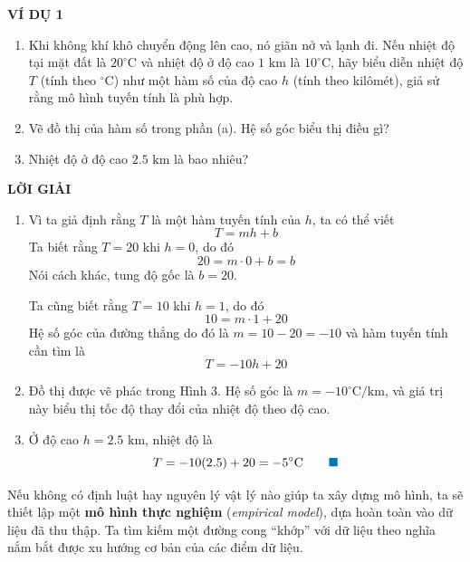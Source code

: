 \begin{minipage}[t]{0.708\textwidth}
    \fontsize{8.8pt}{11.5pt}\selectfont
    \noindent\textbf{\textsf{\color{stewartcyan}VÍ DỤ 1}}
    \begin{enumerate}[label=(\alph*), leftmargin=*, itemsep=2pt, topsep=2pt]
        \item Khi không khí khô chuyển động lên cao, nó giãn nở và lạnh đi. Nếu nhiệt độ tại mặt đất là $20^\circ\text{C}$ và nhiệt độ ở độ cao $1\text{ km}$ là $10^\circ\text{C}$, hãy biểu diễn nhiệt độ $T$ (tính theo $^\circ\text{C}$) như một hàm số của độ cao $h$ (tính theo kilômét), giả sử rằng mô hình tuyến tính là phù hợp.
        \item Vẽ đồ thị của hàm số trong phần (a). Hệ số góc biểu thị điều gì?
        \item Nhiệt độ ở độ cao $2.5\text{ km}$ là bao nhiêu?
    \end{enumerate}

    \vspace{3pt}
    \noindent\textbf{\textsf{\color{stewartcyan}LỜI GIẢI}}
    \begin{enumerate}[label=(\alph*), leftmargin=*, itemsep=3pt, topsep=2pt]
        \item Vì ta giả định rằng $T$ là một hàm tuyến tính của $h$, ta có thể viết
        \[
        T = mh + b
        \]
        Ta biết rằng $T = 20$ khi $h = 0$, do đó
        \[
        20 = m \cdot 0 + b = b
        \]
        Nói cách khác, tung độ gốc là $b = 20$.

        Ta cũng biết rằng $T = 10$ khi $h = 1$, do đó
        \[
        10 = m \cdot 1 + 20
        \]
        Hệ số góc của đường thẳng do đó là $m = 10 - 20 = -10$ và hàm tuyến tính cần tìm là
        \[
        T = -10h + 20
        \]
        \item Đồ thị được vẽ phác trong Hình 3. Hệ số góc là $m = -10^\circ\text{C/km}$, và giá trị này biểu thị tốc độ thay đổi của nhiệt độ theo độ cao.
        \item Ở độ cao $h = 2.5\text{ km}$, nhiệt độ là
        \[
        T = -10(2.5) + 20 = -5^\circ\text{C} \tag*{{\color{stewartcyan}$\blacksquare$}}
        \]
    \end{enumerate}

    \vspace{3pt}
    Nếu không có định luật hay nguyên lý vật lý nào giúp ta xây dựng mô hình, ta sẽ thiết lập một \textbf{mô hình thực nghiệm} (\textit{empirical model}), dựa hoàn toàn vào dữ liệu đã thu thập. Ta tìm kiếm một đường cong ``khớp'' với dữ liệu theo nghĩa nắm bắt được xu hướng cơ bản của các điểm dữ liệu.


\end{minipage}
